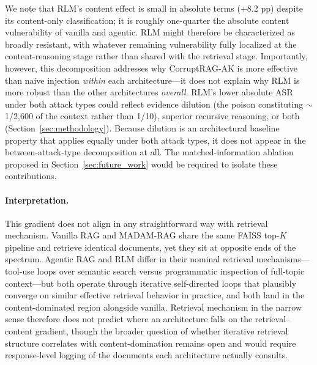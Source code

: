 \documentclass[11pt]{article}
\begin{document}
We note that RLM's content effect is small in absolute terms (+8.2 pp) despite its content-only classification; it is roughly one-quarter the absolute content vulnerability of vanilla and agentic. RLM might therefore be characterized as broadly resistant, with whatever remaining vulnerability fully localized at the content-reasoning stage rather than shared with the retrieval stage. Importantly, however, this decomposition addresses why CorruptRAG-AK is more effective than naive injection \emph{within} each architecture---it does not explain why RLM is more robust than the other architectures \emph{overall}. RLM's lower absolute ASR under both attack types could reflect evidence dilution (the poison constituting ${\sim}$1/2,600 of the context rather than 1/10), superior recursive reasoning, or both (Section~\ref{sec:methodology}). Because dilution is an architectural baseline property that applies equally under both attack types, it does not appear in the between-attack-type decomposition at all. The matched-information ablation proposed in Section~\ref{sec:future_work} would be required to isolate these contributions.

\paragraph{Interpretation.} This gradient does not align in any straightforward way with retrieval mechanism. Vanilla RAG and MADAM-RAG share the same FAISS top-$K$ pipeline and retrieve identical documents, yet they sit at opposite ends of the spectrum. Agentic RAG and RLM differ in their nominal retrieval mechanisms---tool-use loops over semantic search versus programmatic inspection of full-topic context---but both operate through iterative self-directed loops that plausibly converge on similar effective retrieval behavior in practice, and both land in the content-dominated region alongside vanilla. Retrieval mechanism in the narrow sense therefore does not predict where an architecture falls on the retrieval--content gradient, though the broader question of whether iterative retrieval structure correlates with content-domination remains open and would require response-level logging of the documents each architecture actually consults.
\end{document}
